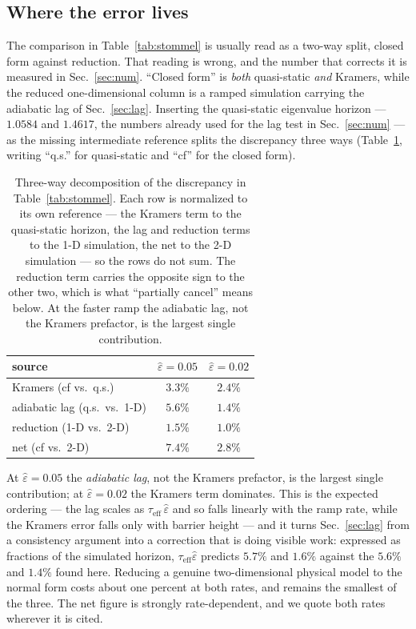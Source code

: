 \documentclass[%
 twocolumn,
 superscriptaddress,
 amsmath,amssymb,
 aps,
 pre,
 floatfix,
]{revtex4-2}
\newcommand{\Sig}{\hat\varepsilon}
\begin{document}
\subsection{Where the error lives}

The comparison in Table~\ref{tab:stommel} is usually read as a two-way split, closed form against reduction.  That reading is wrong, and the number that corrects it is measured in Sec.~\ref{sec:num}.  ``Closed form'' is \emph{both} quasi-static \emph{and} Kramers, while the reduced one-dimensional column is a ramped simulation carrying the adiabatic lag of Sec.~\ref{sec:lag}.  Inserting the quasi-static eigenvalue horizon --- $1.0584$ and $1.4617$, the numbers already used for the lag test in Sec.~\ref{sec:num} --- as the missing intermediate reference splits the discrepancy three ways (Table~\ref{tab:errorsplit}, writing ``q.s.'' for quasi-static and ``cf'' for the closed form).
\begin{table}[b]
\caption{\label{tab:errorsplit}%
Three-way decomposition of the discrepancy in Table~\ref{tab:stommel}.  Each row is normalized to its own reference --- the Kramers term to the quasi-static horizon, the lag and reduction terms to the 1-D simulation, the net to the 2-D simulation --- so the rows do not sum.  The reduction term carries the opposite sign to the other two, which is what ``partially cancel'' means below.  At the faster ramp the adiabatic lag, not the Kramers prefactor, is the largest single contribution.}
\begin{ruledtabular}
\begin{tabular}{lcc}
\hline
source & $\Sig=0.05$ & $\Sig=0.02$ \\
\hline
Kramers (cf vs.\ q.s.)   & $3.3\%$ & $2.4\%$ \\
adiabatic lag (q.s.\ vs.\ 1-D) & $5.6\%$ & $1.4\%$ \\
reduction (1-D vs.\ 2-D) & $1.5\%$ & $1.0\%$ \\
\hline
net (cf vs.\ 2-D)        & $7.4\%$ & $2.8\%$ \\
\end{tabular}
\end{ruledtabular}
\end{table}
At $\Sig=0.05$ the \emph{adiabatic lag}, not the Kramers prefactor, is the largest single contribution; at $\Sig=0.02$ the Kramers term dominates.  This is the expected ordering --- the lag scales as $\tau_{\mathrm{eff}}\,\Sig$ and so falls linearly with the ramp rate, while the Kramers error falls only with barrier height --- and it turns Sec.~\ref{sec:lag} from a consistency argument into a correction that is doing visible work: expressed as fractions of the simulated horizon, $\tau_{\mathrm{eff}}\Sig$ predicts $5.7\%$ and $1.6\%$ against the $5.6\%$ and $1.4\%$ found here.  Reducing a genuine two-dimensional physical model to the normal form costs about one percent at both rates, and remains the smallest of the three.  The net figure is strongly rate-dependent, and we quote both rates wherever it is cited.
\end{document}
